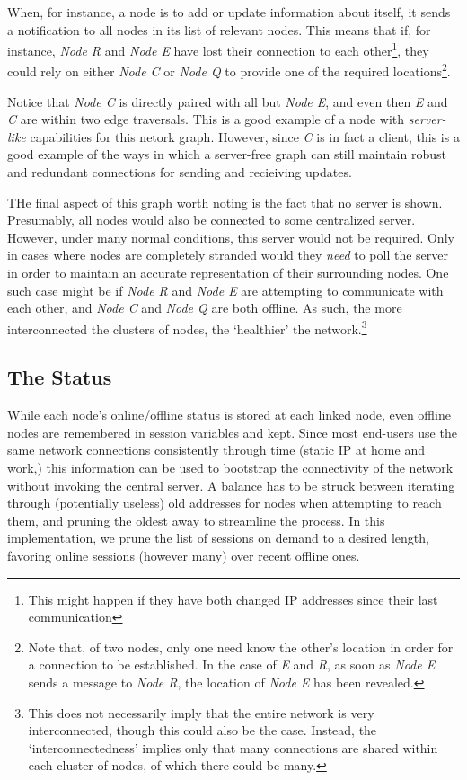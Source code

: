 \documentclass[11pt]{article}
\begin{document}
When, for instance, a node is to add or update information about itself, it sends a notification to all nodes in its list of relevant nodes. This means that if, for instance, \emph{Node R} and \emph{Node E} have lost their connection to each other\footnote{This might happen if they have both changed IP addresses since their last communication}, they could rely on either \emph{Node C} or \emph{Node Q} to provide one of the required locations\footnote{Note that, of two nodes, only one need know the other's location in order for a connection to be established. In the case of \emph{E} and \emph{R}, as soon as \emph{Node E} sends a message to \emph{Node R}, the location of \emph{Node E} has been revealed.}.

Notice that \emph{Node C} is directly paired with all but \emph{Node E}, and even then \emph{E} and \emph{C} are within two edge traversals. This is a good example of a node with \emph{server-like} capabilities for this netork graph. However, since \emph{C} is in fact a client, this is a good example of the ways in which a server-free graph can still maintain robust and redundant connections for sending and recieiving updates.

THe final aspect of this graph worth noting is the fact that no server is shown. Presumably, all nodes would also be connected to some centralized server. However, under many normal conditions, this server would not be required. Only in cases where nodes are completely stranded would they \emph{need} to poll the server in order to maintain an accurate representation of their surrounding nodes. One such case might be if \emph{Node R} and \emph{Node E} are attempting to communicate with each other, and \emph{Node C} and \emph{Node Q} are both offline. As such, the more interconnected the clusters of nodes, the `healthier' the network.\footnote{This does not necessarily imply that the entire network is very interconnected, though this could also be the case. Instead, the `interconnectedness' implies only that many connections are shared within each cluster of nodes, of which there could be many.}

\subsection{The Status}

While each node's online/offline status is stored at each linked node, even offline nodes are remembered in session variables and kept. Since most end-users use the same network connections consistently through time (static IP at home and work,) this information can be used to bootstrap the connectivity of the network without invoking the central server. A balance has to be struck between iterating through (potentially useless) old addresses for nodes when attempting to reach them, and pruning the oldest away to streamline the process. In this implementation, we prune the list of sessions on demand to a desired length, favoring online sessions (however many) over recent offline ones.
   
\end{document}
